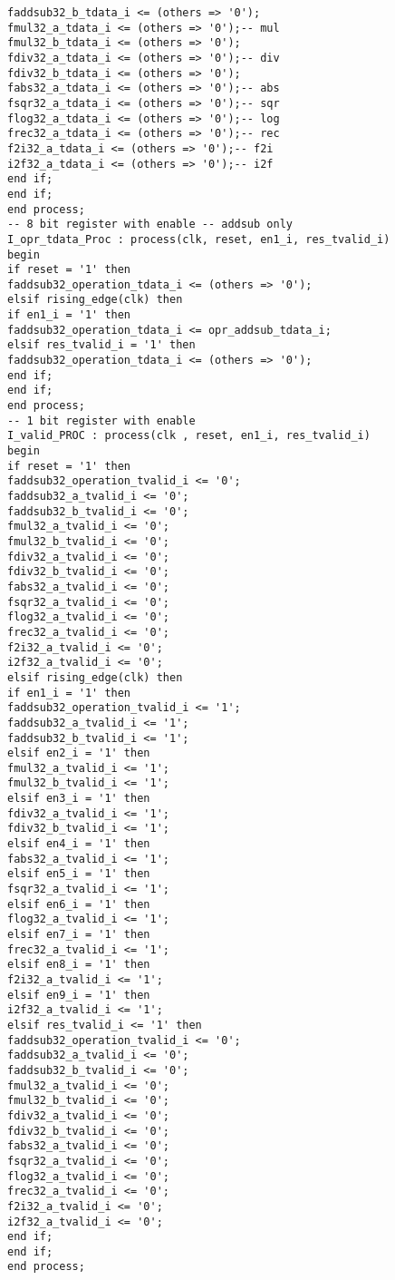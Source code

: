 \documentclass[conference]{IEEEtran}
\begin{document}
\begin{lstlisting}
faddsub32_b_tdata_i <= (others => '0');
fmul32_a_tdata_i <= (others => '0');-- mul
fmul32_b_tdata_i <= (others => '0');
fdiv32_a_tdata_i <= (others => '0');-- div
fdiv32_b_tdata_i <= (others => '0');
fabs32_a_tdata_i <= (others => '0');-- abs	
fsqr32_a_tdata_i <= (others => '0');-- sqr	
flog32_a_tdata_i <= (others => '0');-- log	
frec32_a_tdata_i <= (others => '0');-- rec	
f2i32_a_tdata_i <= (others => '0');-- f2i
i2f32_a_tdata_i <= (others => '0');-- i2f
end if;
end if;
end process;
-- 8 bit register with enable -- addsub only
I_opr_tdata_Proc : process(clk, reset, en1_i, res_tvalid_i)
begin 
if reset = '1' then 
faddsub32_operation_tdata_i <= (others => '0');			
elsif rising_edge(clk) then
if en1_i = '1' then
faddsub32_operation_tdata_i <= opr_addsub_tdata_i;
elsif res_tvalid_i = '1' then 
faddsub32_operation_tdata_i <= (others => '0');
end if;
end if;
end process;
-- 1 bit register with enable 
I_valid_PROC : process(clk , reset, en1_i, res_tvalid_i)
begin
if reset = '1' then
faddsub32_operation_tvalid_i <= '0';
faddsub32_a_tvalid_i <= '0';
faddsub32_b_tvalid_i <= '0';
fmul32_a_tvalid_i <= '0';
fmul32_b_tvalid_i <= '0';
fdiv32_a_tvalid_i <= '0';
fdiv32_b_tvalid_i <= '0';
fabs32_a_tvalid_i <= '0';
fsqr32_a_tvalid_i <= '0';
flog32_a_tvalid_i <= '0';
frec32_a_tvalid_i <= '0';
f2i32_a_tvalid_i <= '0';
i2f32_a_tvalid_i <= '0';
elsif rising_edge(clk) then
if en1_i = '1' then
faddsub32_operation_tvalid_i <= '1';
faddsub32_a_tvalid_i <= '1';
faddsub32_b_tvalid_i <= '1';
elsif en2_i = '1' then
fmul32_a_tvalid_i <= '1';
fmul32_b_tvalid_i <= '1';
elsif en3_i = '1' then
fdiv32_a_tvalid_i <= '1';
fdiv32_b_tvalid_i <= '1';
elsif en4_i = '1' then
fabs32_a_tvalid_i <= '1';
elsif en5_i = '1' then
fsqr32_a_tvalid_i <= '1';
elsif en6_i = '1' then
flog32_a_tvalid_i <= '1';
elsif en7_i = '1' then
frec32_a_tvalid_i <= '1';
elsif en8_i = '1' then
f2i32_a_tvalid_i <= '1';
elsif en9_i = '1' then
i2f32_a_tvalid_i <= '1';
elsif res_tvalid_i <= '1' then
faddsub32_operation_tvalid_i <= '0';
faddsub32_a_tvalid_i <= '0';
faddsub32_b_tvalid_i <= '0';
fmul32_a_tvalid_i <= '0';
fmul32_b_tvalid_i <= '0';
fdiv32_a_tvalid_i <= '0';
fdiv32_b_tvalid_i <= '0';
fabs32_a_tvalid_i <= '0';
fsqr32_a_tvalid_i <= '0';
flog32_a_tvalid_i <= '0';
frec32_a_tvalid_i <= '0';
f2i32_a_tvalid_i <= '0';
i2f32_a_tvalid_i <= '0';
end if;
end if;
end process;


\end{lstlisting}
\end{document}
